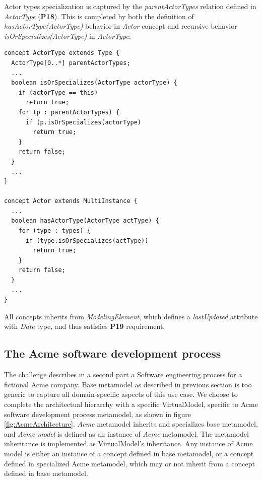 Actor types specialization is captured by the \textit{parentActorTypes} relation defined in \textit{ActorType} (\textbf{P18}). This is completed by both the definition of \textit{hasActorType(ActorType)} behavior in \textit{Actor} concept and recursive behavior \textit{isOrSpecializes(ActorType)} in \textit{ActorType}:

\begin{lstlisting}
concept ActorType extends Type {
  ActorType[0..*] parentActorTypes;
  ...
  boolean isOrSpecializes(ActorType actorType) {    
    if (actorType == this)   
      return true;      
    for (p : parentActorTypes) {      
      if (p.isOrSpecializes(actorType)
        return true;
    }
    return false;
  }
  ...
}

concept Actor extends MultiInstance {
  ...
  boolean hasActorType(ActorType actType) {      
    for (type : types) {
      if (type.isOrSpecializes(actType))
        return true;
    }
    return false;
  }     
  ...
}
\end{lstlisting}

All concepts inherits from \textit{ModelingElement}, which defines a \textit{lastUpdated} attribute with \textit{Date} type, and thus satisfies \textbf{P19} requirement. 

\subsection{The Acme software development process}
\label{sec:AcmeSoftwareDevelopmentProcess}

The challenge describes in a second part a Software engineering process for a fictional Acme company. Base metamodel as described in previous section is too generic to capture all domain-specific aspects of this use case. We choose to complete the architectual hierarchy with a specific VirtualModel, specific to Acme software development process metamodel, as shown in figure \ref{fig:AcmeArchitecture}. \textit{Acme} metamodel inherits and specializes base metamodel, and \textit{Acme model} is defined as an instance of \textit{Acme} metamodel. The metamodel inheritance is implemented as VirtualModel's inheritance. Any instance of Acme model is either an instance of a concept defined in base metamodel, or a concept defined in specialized Acme metamodel, which may or not inherit from a concept defined in base metamodel.

